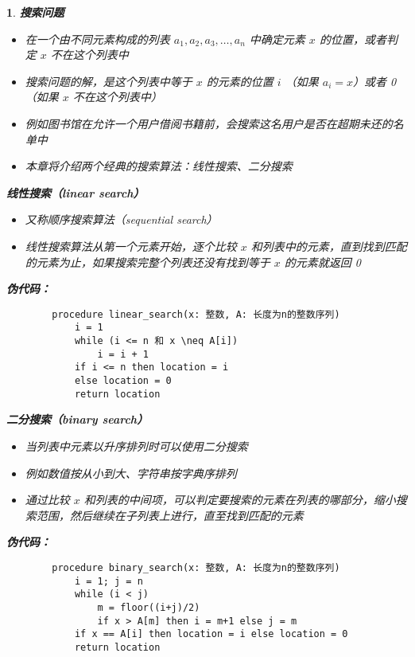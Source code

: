 \documentclass[UTF8]{report}
\theoremstyle{MyLineTheoremStyle} %
\theoremstyle{MyBlockTheoremStyle} %
\theoremstyle{MySubsubsectionStyle} %
\newtheorem{definition}{}
\begin{document}
\begin{definition}
    \textbf{搜索问题}\par
    \begin{itemize}
        \item 在一个由不同元素构成的列表 $a_1, a_2, a_3, \ldots, a_n$ 中确定元素 $x$ 的位置，或者判定 $x$ 不在这个列表中
        \item 搜索问题的解，是这个列表中等于 $x$ 的元素的位置 $i$ （如果 $a_i = x$）或者 0 （如果 $x$ 不在这个列表中）
        \item 例如图书馆在允许一个用户借阅书籍前，会搜索这名用户是否在超期未还的名单中
        \item 本章将介绍两个经典的搜索算法：线性搜索、二分搜索
    \end{itemize}

    \textbf{线性搜索（linear search）}\par
    \begin{itemize}
        \item 又称顺序搜索算法（sequential search）
        \item 线性搜索算法从第一个元素开始，逐个比较 $x$ 和列表中的元素，直到找到匹配的元素为止，如果搜索完整个列表还没有找到等于 $x$ 的元素就返回 0
    \end{itemize}

    \textbf{伪代码：}\par
    \begin{verbatim}
        procedure linear_search(x: 整数, A: 长度为n的整数序列)
            i = 1
            while (i <= n 和 x \neq A[i])
                i = i + 1
            if i <= n then location = i
            else location = 0
            return location
    \end{verbatim}

    \textbf{二分搜索（binary search）}\par
    \begin{itemize}
        \item 当列表中元素以升序排列时可以使用二分搜索
        \item 例如数值按从小到大、字符串按字典序排列
        \item 通过比较 $x$ 和列表的中间项，可以判定要搜索的元素在列表的哪部分，缩小搜索范围，然后继续在子列表上进行，直至找到匹配的元素
    \end{itemize}

    \textbf{伪代码：}\par
    \begin{verbatim}
        procedure binary_search(x: 整数, A: 长度为n的整数序列)
            i = 1; j = n
            while (i < j)
                m = floor((i+j)/2)
                if x > A[m] then i = m+1 else j = m
            if x == A[i] then location = i else location = 0
            return location
    \end{verbatim}
\end{definition}
\end{document}
